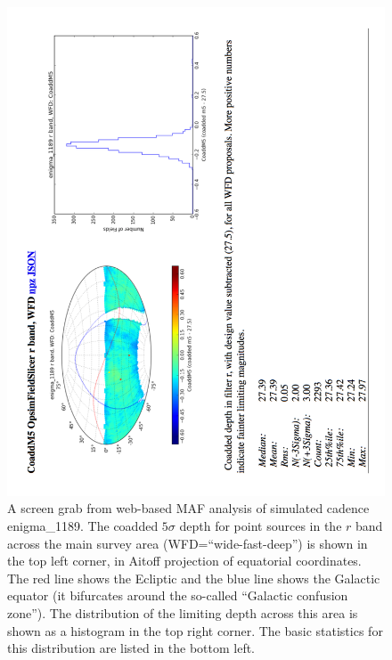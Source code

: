 \documentclass[manuscript]{article}
\begin{document}
\begin{figure}[t!]
\vskip -0.1in
\includegraphics[angle=270,width=0.99\hsize,clip]{enigma1189_DWFcoaddr5.pdf}
\caption{A screen grab from web-based MAF analysis of simulated cadence
enigma\_1189. The coadded $5\sigma$ depth for point sources in the $r$ band 
across the main survey area (WFD=``wide-fast-deep'') is shown in the top left corner,
in Aitoff projection of equatorial coordinates. The red line shows the Ecliptic and
the blue line shows the Galactic equator (it bifurcates around the so-called 
``Galactic confusion zone'').  The distribution of the limiting depth across this
area is shown as a histogram in the top right corner. The basic statistics for
this distribution are listed in the bottom left.} 
\label{fig:coaddm5enigma}
\end{figure}
\end{document}
